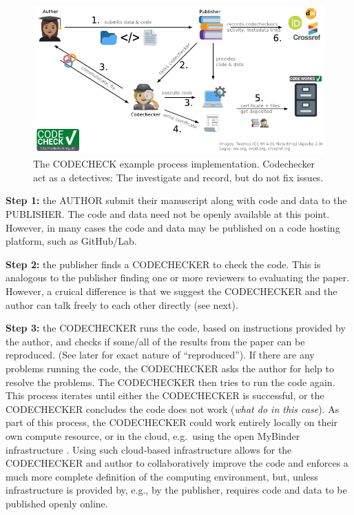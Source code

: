 \documentclass[12pt]{article}
\begin{document}
\begin{figure}
  \centering
      \includegraphics[width=\textwidth]{figs/codecheck_overview.pdf}
  \caption{The CODECHECK example process implementation. Codechecker act as a detectives:
  The investigate and record, but do not fix issues.}
  \label{fig:worfklow}
\end{figure}

\textbf{Step 1:} the AUTHOR submit their manuscript along with code and data to
the PUBLISHER. The code and data need not be openly available at this point.
However, in many cases the code and data may be published on a code hosting platform,
such as GitHub/Lab.

\textbf{Step 2:} the publisher finds a CODECHECKER to check the code. This is
analogous to the publisher finding one or more reviewers to evaluating
the paper. However, a cruical difference is that we suggest the CODECHECKER
and the author can talk freely to each other directly (see next).

\textbf{Step 3:} the CODECHECKER runs the code, based on instructions provided by
the author, and checks if some/all of the results from the paper can be
reproduced. (See later for exact nature of ``reproduced''). If there are
any problems running the code, the CODECHECKER asks the author for help
to resolve the problems. The CODECHECKER then tries to run the code
again. This process iterates until either the CODECHECKER is successful,
or the CODECHECKER concludes the code does not work (\emph{what do in this
case}). As part of this process, the CODECHECKER could work entirely
locally on their own compute resource, or in the cloud, e.g.~using the open
MyBinder infrastructure \cite{jupyter_binder_2018}. Using such cloud-based 
infrastructure allows for the CODECHECKER and author to collaboratively improve
the code and enforces a much more complete definition of the computing environment,
but, unless infrastructure is provided by, e.g., by the publisher, requires code
and data to be published openly online.
\end{document}

